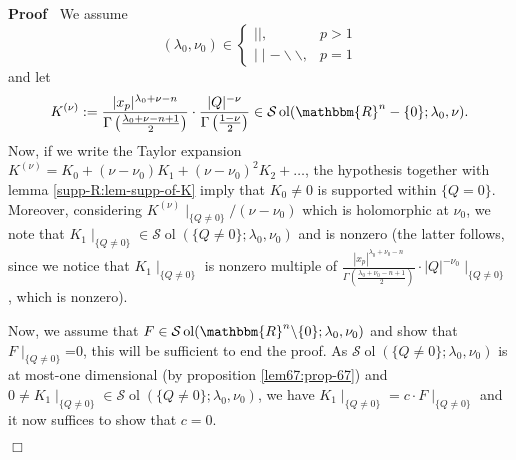 \documentclass{article}
\newcommand{\assign}{:=}
\newcommand{\tmop}[1]{\ensuremath{\operatorname{#1}}}
\newcommand{\um}{-}
\renewenvironment{proof}{\noindent\textbf{Proof\ }}{\hspace*{\fill}$\Box$\medskip}
\theoremstyle{remark}
\begin{document}
\begin{proof}
  We assume
  \[ (\lambda_0, \nu_0) \in \left\{ \begin{array}{ll}
       \mid \mid, & p > 1\\
       \mid \mid \um \backslash\backslash, & p = 1
     \end{array} \right. \]
  and let
  \[ K^{(\nu)} \assign \frac{| x_p |^{\lambda_0 + \nu - n}}{\Gamma \left(
     \frac{\lambda_0 + \nu - n + 1}{2} \right)} \cdot \frac{| Q |^{-
     \nu}}{\Gamma \left( \frac{1 - \nu}{2} \right)} \in \mathcal{S} \tmop{ol}
     (\mathbbm{R}^n - \{ 0 \} ; \lambda_0, \nu) . \]
  Now, if we write the Taylor expansion $K^{(\nu)} = K_0 + (\nu - \nu_0)
  K_1 + (\nu - \nu_0)^2 K_2 + \ldots$, the hypothesis together with lemma
  \ref{supp-R:lem-supp-of-K} imply that $K_0 \neq 0$ is supported within $\{ Q
  = 0 \}$. Moreover, considering $K^{(\nu)} \mid_{\{ Q \neq 0 \}} / (\nu -
  \nu_0)$ which is holomorphic at $\nu_0$, we note that $K_1 \mid_{\{ Q
  \neq 0 \}} \in \mathcal{S} \tmop{ol} (\{ Q \neq 0 \} ; \lambda_0, \nu_0)$
  and is nonzero (the latter follows, since we notice that $K_1 \mid_{\{ Q
  \neq 0 \}}$ is nonzero multiple of $\frac{| x_p |^{\lambda_0 + \nu_0 -
  n}}{\Gamma \left( \frac{\lambda_0 + \nu_0 - n + 1}{2} \right)} \cdot | Q
  |^{- \nu_0} \mid_{\{ Q \neq 0 \}}$, which is nonzero).
  
  Now, we assume that $F \in \mathcal{S} \tmop{ol} (\mathbbm{R}^n \backslash
  \{ 0 \} ; \lambda_0, \nu_0)$ and show that $F \mid_{\{ Q \neq 0 \}}$=0,
  this will be sufficient to end the proof. As $\mathcal{S} \tmop{ol} (\{ Q
  \neq 0 \} ; \lambda_0, \nu_0)$ is at most-one dimensional (by proposition
  \ref{lem67:prop-67}) and $0 \neq K_1 \mid_{\{ Q \neq 0 \}} \in
  \mathcal{S} \tmop{ol} (\{ Q \neq 0 \} ; \lambda_0, \nu_0)$, we have $K_1
  \mid_{\{ Q \neq 0 \}} = c \cdot F \mid_{\{ Q \neq 0 \}}$ and it now
  suffices to show that $c = 0$.
  

\end{proof}
\end{document}
